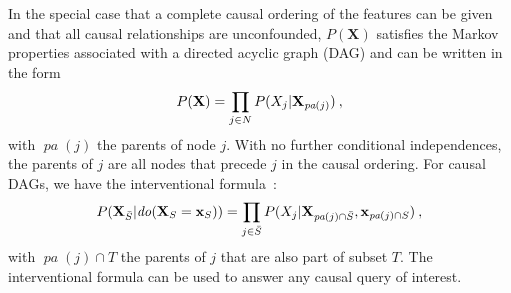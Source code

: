 \documentclass{article}
\newcommand{\vX}{\mathbf{X}}
\newcommand{\vx}{\mathbf{x}}
\newcommand{\dodo}{\mathit{do}}
\newcommand{\lvdo}[1]{\dodo(\vX_{#1} = \vx_{#1})}
\newcommand{\pa}{\mathop{\textit{pa}}}
\newcommand{\spa}{\mathop{\textit{\scriptsize pa}}}
\newcommand{\allfeatures}{{N}}
\begin{document}
In the special case that a complete causal ordering of the features can be given and that all causal relationships are unconfounded, $P(\vX)$ satisfies the Markov properties associated with a directed acyclic graph (DAG) and can be written in the form
\[
P(\vX) = \prod_{j \in \allfeatures} P(X_j|\vX_{\spa(j)}) \: ,
\]
with $\pa(j)$ the parents of node $j$. With no further conditional independences, the parents of $j$ are all nodes that precede $j$ in the causal ordering. For causal DAGs, we have the interventional formula~\cite{lauritzen2002chain}:
\begin{equation}
P(\vX_{\bar{S}}|\lvdo{S}) = \prod_{j \in \bar{S}} P(X_j|\vX_{\spa(j)  \cap \bar{S}},\vx_{\spa(j) \cap S}) \: ,
\label{eq:interventional}
\end{equation}
with $\pa(j) \cap T$ the parents of $j$ that are also part of subset $T$. The interventional formula can be used to answer any causal query of interest.

\end{document}
